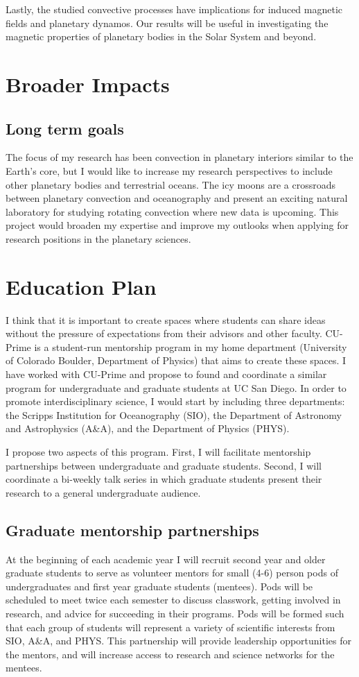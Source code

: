 \documentclass[12pt]{article}
\begin{document}
Lastly, the studied convective processes have implications for induced magnetic fields and planetary dynamos. Our results will be useful in investigating the magnetic properties of planetary bodies in the Solar System and beyond.
\section{Broader Impacts}

%
\subsection{Long term goals}
The focus of my research has been convection in planetary interiors similar to the Earth's core, but I would like to increase my research perspectives to include other planetary bodies and terrestrial oceans. The icy moons are a crossroads between planetary convection and oceanography and present an exciting natural laboratory for studying rotating convection where new data is upcoming. This project would broaden my expertise and improve my outlooks when applying for research positions in the planetary sciences.
\section*{Education Plan}
I think that it is important to create spaces where students can share ideas without the pressure of expectations from their advisors and other faculty.
CU-Prime\citep{cup} is a student-run mentorship program in my home department (University of Colorado Boulder, Department of Physics) that aims to create these spaces. 
I have worked with CU-Prime and propose to found and coordinate a similar program for undergraduate and graduate students at UC San Diego. In order to promote interdisciplinary science, I would start by including three departments: the Scripps Institution for Oceanography (SIO), the Department of Astronomy and Astrophysics (A\&A), and the Department of Physics (PHYS). 

I propose two aspects of this program. First, I will facilitate mentorship partnerships between undergraduate and graduate students. Second, I will coordinate a bi-weekly talk series in which graduate students present their research to a general undergraduate audience. 

\subsection*{Graduate mentorship partnerships}
At the beginning of each academic year I will recruit second year and older graduate students to serve as volunteer mentors for small (4-6) person pods of undergraduates and first year graduate students (mentees). Pods will be scheduled to meet twice each semester to discuss classwork, getting involved in research, and advice for succeeding in their programs. 
Pods will be formed such that each group of students will represent a variety of scientific interests from SIO, A\&A, and PHYS. 
This partnership will provide leadership opportunities for the mentors, and will increase access to research and science networks for the mentees.
\end{document}
